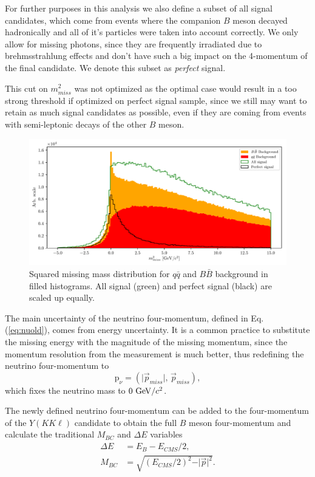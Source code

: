For further purposes in this analysis we also define a subset of all signal candidates, which come from events where the companion $B$ meson decayed hadronically and all of it's particles were taken into account correctly. We only allow for missing photons, since they are frequently irradiated due to brehmsstrahlung effects and don't have such a big impact on the 4-momentum of the final candidate. We denote this subset as \textit{perfect} signal.

This cut on $m_{miss}^2$ was not optimized as the optimal case would result in a too strong threshold if optimized on perfect signal sample, since we still may want to retain as much signal candidates as possible, even if they are coming from events with semi-leptonic decays of the other $B$ meson.

\begin{figure}[H]
\centering
\captionsetup{width=.8\linewidth}
\includegraphics[width=\linewidth]{fig/missM2}
\caption{Squared missing mass distribution for $q \bar q$ and $B \bar B$ background in filled histograms. All signal (green) and perfect signal (black) are scaled up equally.}
\label{fig:missm2}
\end{figure}

The main uncertainty of the neutrino four-momentum, defined in Eq. (\ref{eq:nuold}), comes from energy uncertainty. It is a common practice to substitute the missing energy with the magnitude of the missing momentum, since the momentum resolution from the measurement is much better, thus redefining the neutrino four-momentum to
\begin{equation}
\label{eq:nunew}
\mathrm{p}_\nu = \left(\vert \vec{p}_{miss} \vert,\,\vec{p}_{miss} \right),
\end{equation}
which fixes the neutrino mass to $0\mathrm{~GeV}/c^2$.

The newly defined neutrino four-momentum can be added to the four-momentum of the $Y(KK\ell)$ candidate to obtain the full $B$ meson four-momentum and calculate the traditional $M_{BC}$ and $\Delta E$ variables
\begin{align}
\label{eq:de}
\Delta E &= E_B - E_{CMS}/2,\\
M_{BC} &= \sqrt{\left(E_{CMS}/2\right)^2 - \vert \vec{p} \vert^2}.
\end{align}

